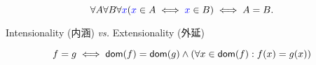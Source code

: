 \begin{frame}{}
  \begin{definition}
    \[
      \forall A \forall B \forall \textcolor{blue}{x} (\textcolor{blue}{x} \in A \iff \textcolor{blue}{x} \in B) \iff A = B.
    \]
  \end{definition}

  \vspace{0.80cm}
  \centerline{Intensionality (内涵) \emph{vs.} Extensionality (外延)}
  \vspace{0.80cm}

  \pause
  \begin{definition}[函数的外延性原则]
    \[
      f = g \iff \textsf{dom}(f) = \textsf{dom}(g) \land (\forall x \in \textsf{dom}(f): f(x) = g(x))
    \]
  \end{definition}
\end{frame}
